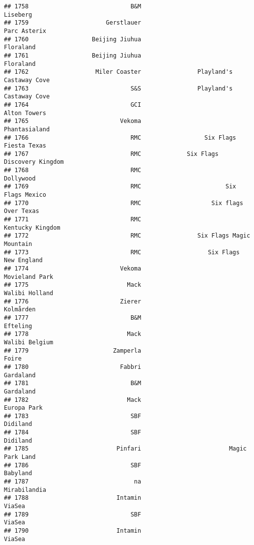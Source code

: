 \documentclass[
]{article}
\begin{document}
\begin{verbatim}
## 1758                             B&M                                Liseberg
## 1759                      Gerstlauer                            Parc Asterix
## 1760                  Beijing Jiuhua                               Floraland
## 1761                  Beijing Jiuhua                               Floraland
## 1762                   Miler Coaster                Playland's Castaway Cove
## 1763                             S&S                Playland's Castaway Cove
## 1764                             GCI                            Alton Towers
## 1765                          Vekoma                           Phantasialand
## 1766                             RMC                  Six Flags Fiesta Texas
## 1767                             RMC             Six Flags Discovery Kingdom
## 1768                             RMC                               Dollywood
## 1769                             RMC                        Six Flags Mexico
## 1770                             RMC                    Six flags Over Texas
## 1771                             RMC                        Kentucky Kingdom
## 1772                             RMC                Six Flags Magic Mountain
## 1773                             RMC                   Six Flags New England
## 1774                          Vekoma                          Movieland Park
## 1775                            Mack                          Walibi Holland
## 1776                          Zierer                               Kolmården
## 1777                             B&M                                Efteling
## 1778                            Mack                          Walibi Belgium
## 1779                        Zamperla                                   Foire
## 1780                          Fabbri                               Gardaland
## 1781                             B&M                               Gardaland
## 1782                            Mack                             Europa Park
## 1783                             SBF                                Didiland
## 1784                             SBF                                Didiland
## 1785                         Pinfari                         Magic Park Land
## 1786                             SBF                                Babyland
## 1787                              na                            Mirabilandia
## 1788                         Intamin                                  ViaSea
## 1789                             SBF                                  ViaSea
## 1790                         Intamin                                  ViaSea

\end{verbatim}
\end{document}
